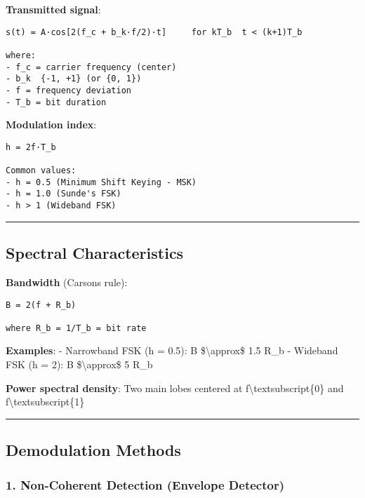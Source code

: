 \textbf{Transmitted signal}:

\begin{verbatim}
s(t) = A·cos[2(f_c + b_k·f/2)·t]     for kT_b  t < (k+1)T_b

where:
- f_c = carrier frequency (center)
- b_k  {-1, +1} (or {0, 1})
- f = frequency deviation
- T_b = bit duration
\end{verbatim}

\textbf{Modulation index}:

\begin{verbatim}
h = 2f·T_b

Common values:
- h = 0.5 (Minimum Shift Keying - MSK)
- h = 1.0 (Sunde's FSK)
- h > 1 (Wideband FSK)
\end{verbatim}

\begin{center}\rule{0.5\linewidth}{0.5pt}\end{center}

\subsection{\texorpdfstring{ Spectral
Characteristics}{ Spectral Characteristics}}\label{spectral-characteristics}

\textbf{Bandwidth} (Carson\textquotesingle s rule):

\begin{verbatim}
B = 2(f + R_b)

where R_b = 1/T_b = bit rate
\end{verbatim}

\textbf{Examples}: - Narrowband FSK (h = 0.5): B
\$\textbackslash approx\$ 1.5 R\_b - Wideband FSK (h = 2): B
\$\textbackslash approx\$ 5 R\_b

\textbf{Power spectral density}: Two main lobes centered at
f\textbackslash textsubscript\{0\} and
f\textbackslash textsubscript\{1\}

\begin{center}\rule{0.5\linewidth}{0.5pt}\end{center}

\subsection{\texorpdfstring{ Demodulation
Methods}{ Demodulation Methods}}\label{demodulation-methods}

\subsubsection{1. Non-Coherent Detection (Envelope
Detector)}\label{non-coherent-detection-envelope-detector}

